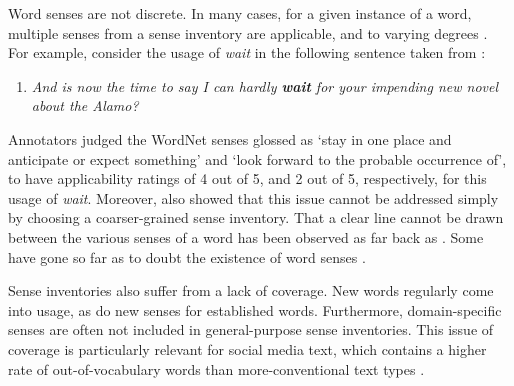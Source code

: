 \documentclass[11pt]{article}
\begin{document}

Word senses are not discrete. In many cases, for a given instance of a
word, multiple senses from a sense inventory are applicable, and to
varying degrees \cite{Erk2009b}. For example, consider the usage of
\emph{wait} in the following sentence taken from
:

\begin{enumerate}

\item \emph{And is now the time to say I can hardly \textbf{wait}
  for your impending new novel about the Alamo?}
\end{enumerate}

\noindent
Annotators judged the WordNet \cite{Fellbaum1998} senses glossed as
`stay in one place and anticipate or expect something' and `look
forward to the probable occurrence of', to have applicability ratings
of 4 out of 5, and 2 out of 5, respectively, for this usage of
\emph{wait}. Moreover,  also showed that this issue
cannot be addressed simply by choosing a coarser-grained sense
inventory. That a clear line cannot be drawn between the various
senses of a word has been observed as far back as
. Some have gone so far as to doubt the existence of
word senses \cite{Kilgarriff1997}.





Sense inventories also suffer from a lack of coverage. New words
regularly come into usage, as do new senses for established
words. Furthermore, domain-specific senses are often not included in
general-purpose sense inventories.
This issue of coverage is particularly relevant for social media text,
which contains a higher rate of out-of-vocabulary words than
more-conventional text types \cite{Baldwin+:2013}.

\end{document}

